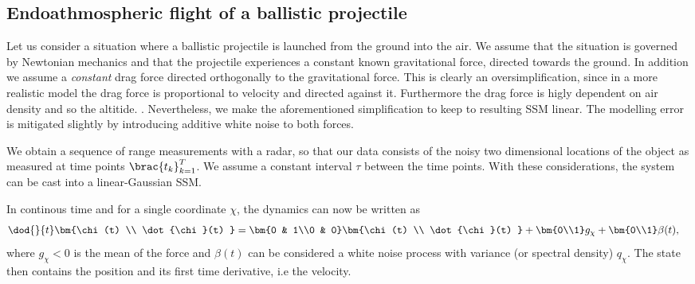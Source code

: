 \clearpage

\subsection{Endoathmospheric flight of a ballistic projectile}\label{sec:ballistic}
Let us consider a situation where a ballistic projectile is launched
from the ground into the air. We assume that the situation is governed by Newtonian
mechanics and that the projectile experiences a constant known gravitational
force, directed towards the ground. In addition we assume a \emph{constant}
drag force directed orthogonally to the gravitational force. This is clearly
an oversimplification, since in a more realistic model the drag
force is proportional to velocity and directed against it. Furthermore
the drag force is higly dependent on air density and so the altitide. \parencite{ristic2004beyond}.
Nevertheless, we make the aforementioned simplification to keep to resulting
SSM linear. The modelling error is mitigated slightly by introducing
additive white noise to both forces.

We obtain a sequence of range measurements with a radar,
so that our data consists of the noisy two dimensional locations 
of the object as measured at time points $\brac{t_k}_{k=1}^T$.
We assume a constant interval $\tau$ between the time points. With these 
considerations, the system can be cast into a linear-Gaussian SSM. 

In continous time and for a single coordinate $\chi$, 
the dynamics can now be written as
\begin{align}
	\dod{}{t}\bm{\chi(t) \\ \dot{\chi}(t) } &= 
	\bm{0 & 1\\0 & 0}\bm{\chi(t) \\ \dot{\chi}(t) } + \bm{0\\1}g_\chi + \bm{0\\1}\beta(t),
	\label{eq:ct_linear}
\end{align}
where $g_\chi<0$ is the mean of the force and $\beta(t)$ can be considered
a white noise process with variance (or spectral density) $q_\chi$. 
The state then contains the position and its first time derivative, i.e the velocity. 


